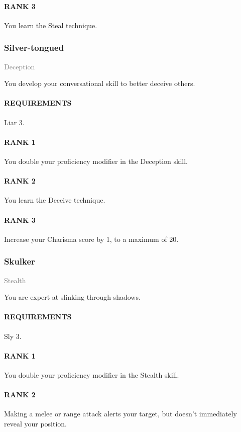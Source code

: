 \paragraph{RANK 3} You learn the Steal technique.

\subsubsection{Silver-tongued} \label{feat::silvertongued}
\small{\textcolor{gray}{Deception}}

\normalsize
You develop your conversational skill to better deceive others.
\paragraph{REQUIREMENTS} Liar 3.
\paragraph{RANK 1} You double your proficiency modifier in the Deception skill.
\paragraph{RANK 2} You learn the Deceive technique.
\paragraph{RANK 3} Increase your Charisma score by 1, to a maximum of 20.

\subsubsection{Skulker} \label{feat::skulker}
\small{\textcolor{gray}{Stealth}}

\normalsize
You are expert at slinking through shadows.
\paragraph{REQUIREMENTS} Sly 3.
\paragraph{RANK 1} You double your proficiency modifier in the Stealth skill.
\paragraph{RANK 2} Making a melee or range attack alerts your target, but doesn't immediately reveal your position.
